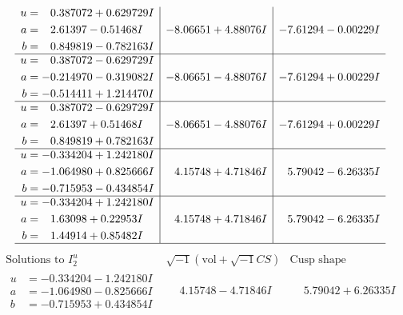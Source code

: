 \documentclass[1p]{elsarticle_modified}
\theoremstyle{definition}
\newcommand{\I}{\sqrt{-1}}
\begin{document}
$$\begin{array}{c|c|c}
\begin{aligned}
u &= \phantom{-}0.387072 + 0.629729 I \\
a &= \phantom{-}2.61397 - 0.51468 I \\
b &= \phantom{-}0.849819 - 0.782163 I\end{aligned}
 & -8.06651 + 4.88076 I & -7.61294 - 0.00229 I \\ \hline\begin{aligned}
u &= \phantom{-}0.387072 - 0.629729 I \\
a &= -0.214970 - 0.319082 I \\
b &= -0.514411 + 1.214470 I\end{aligned}
 & -8.06651 - 4.88076 I & -7.61294 + 0.00229 I \\ \hline\begin{aligned}
u &= \phantom{-}0.387072 - 0.629729 I \\
a &= \phantom{-}2.61397 + 0.51468 I \\
b &= \phantom{-}0.849819 + 0.782163 I\end{aligned}
 & -8.06651 - 4.88076 I & -7.61294 + 0.00229 I \\ \hline\begin{aligned}
u &= -0.334204 + 1.242180 I \\
a &= -1.064980 + 0.825666 I \\
b &= -0.715953 - 0.434854 I\end{aligned}
 & \phantom{-}4.15748 + 4.71846 I & \phantom{-}5.79042 - 6.26335 I \\ \hline\begin{aligned}
u &= -0.334204 + 1.242180 I \\
a &= \phantom{-}1.63098 + 0.22953 I \\
b &= \phantom{-}1.44914 + 0.85482 I\end{aligned}
 & \phantom{-}4.15748 + 4.71846 I & \phantom{-}5.79042 - 6.26335 I\\
 \hline 
 \end{array}$$\newpage$$\begin{array}{c|c|c}  
\text{Solutions to }I^u_{2}& \I (\text{vol} + \sqrt{-1}CS) & \text{Cusp shape}\\
 \hline 
\begin{aligned}
u &= -0.334204 - 1.242180 I \\
a &= -1.064980 - 0.825666 I \\
b &= -0.715953 + 0.434854 I\end{aligned}
 & \phantom{-}4.15748 - 4.71846 I & \phantom{-}5.79042 + 6.26335 I \\ \hline\begin{aligned}

\end{aligned}
\end{array}$$
\end{document}
